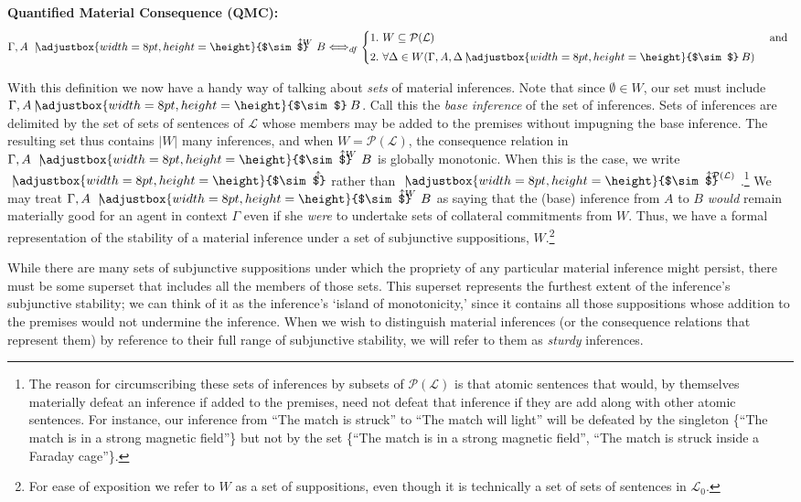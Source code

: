 \documentclass{svjour3}                     %
\newcommand{\ssim}{%
     \setbox0=\hbox{$\sim$}%
     \adjustbox{width=8pt,height=\height}{$\sim$}
}
\newcommand{\uuparrow}{%
     \setbox0=\hbox{$\scriptstyle\uparrow$}%
     \raisebox{.2ex}[5pt]{$\scriptstyle\uparrow$}
}
\newcommand{\nmc}{\mathbin{\mid\joinrel\!\!\ssim}}
\newcommand{\qmc}[4][\Gamma,]{{#1#2\,\,\mathrel{\nmc}}^{\!\!\!\!\!\!\!\uuparrow\scriptstyle #4}\,\,#3}
\newcommand{\mqmc}[3][\Gamma,]{{#1#2\,\,\mathrel{\nmc}}^{\!\!\!\!\!\!\uuparrow}\,\,#3}
\begin{document}
\noindent\textbf{Quantified Material Consequence (QMC):}
		\begin{equation}
              \qmc{A}{B}{W} \Longleftrightarrow_{df}
				      \begin{cases}\nonumber
				        1.\,\, W\subseteq\mathcal{P}(\mathcal{L}) & $ and $ \\[3pt] 
						2.\,\, \forall\Delta\in W(\Gamma, A,  \Delta \nmc B ) 
						\end{cases}
		\end{equation}
		
With this definition we now have a handy way of talking about \textit{sets} of material inferences. Note that since $ \emptyset \in W $, our set must include $ \Gamma, A \nmc B $. Call this the \textit{base inference} of the set of inferences. Sets of inferences are delimited by the set of sets of sentences of $ \mathcal{L} $ whose members may be added to the premises without impugning the base inference. The resulting set thus contains $ |W| $ many inferences,  and when $ W = \mathcal{P}(\mathcal{L}) $, the consequence relation in $\qmc{A}{B}{W} $ is globally monotonic. When this is the case, we write $ \mqmc[]{}{} $  rather than $ \qmc[]{}{}{ \mathcal{P}(\mathcal{L}) }$.\footnote{The reason for circumscribing these sets of inferences by subsets of $ \mathcal{P}(\mathcal{L}) $ is that atomic sentences that would, by themselves materially defeat an inference if added to the premises, need not defeat that inference if they are add along with other atomic sentences. For instance, our inference from ``The match is struck'' to ``The match will light'' will be defeated by the singleton \{``The match is in a strong magnetic field''\}       but not by the set \{``The match is in a strong magnetic field'', ``The match is struck inside a Faraday cage''\}.} We may treat $ \qmc{A}{B}{W}  $ as saying that the (base) inference from $ A $ to $ B $ \textit{would} remain materially good for an agent in context $ \Gamma $ even if she \textit{were} to undertake sets of collateral commitments from $ W $. Thus, we have a formal representation of the stability of a material inference under a set of subjunctive suppositions, $W$.\footnote{For ease of exposition we refer to $W$ as a set of suppositions, even though it is technically a set of sets of sentences in $\mathcal{L}_0$.}

While there are many sets of subjunctive suppositions under which the propriety of any particular material inference might persist, there must be some superset that includes all the members of those sets. This superset represents the furthest extent of the inference's subjunctive stability; we can think of it as the inference's `island of monotonicity,' since it contains all those suppositions whose addition to the premises would not undermine the inference. When we wish to distinguish material inferences (or the consequence relations that represent them) by reference to their full range of subjunctive stability, we will refer to them as \textit{sturdy} inferences. 
\end{document}
